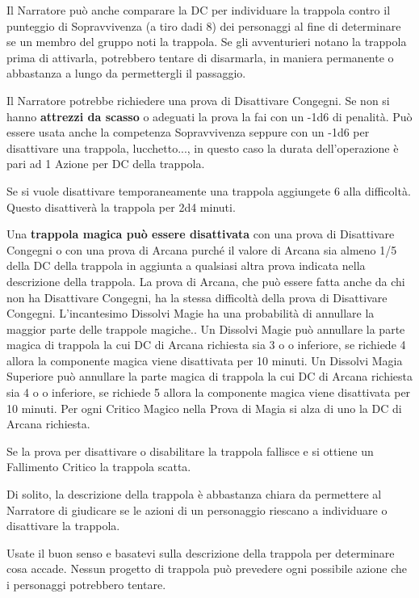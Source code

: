 \begin{multicols}{2}
Il Narratore può anche comparare la DC per individuare la trappola contro il punteggio di Sopravvivenza (a tiro dadi 8) dei personaggi al fine di determinare se un membro del gruppo noti la trappola. Se gli avventurieri notano la trappola prima di attivarla, potrebbero tentare di disarmarla, in maniera permanente o abbastanza a lungo da permettergli il passaggio.

Il Narratore potrebbe richiedere una prova di Disattivare Congegni. Se non si hanno \textbf{attrezzi da scasso} o adeguati la prova la fai con un -1d6 di penalità. Può essere usata anche la competenza Sopravvivenza seppure con un -1d6 per disattivare una trappola, lucchetto..., in questo caso la durata dell'operazione è pari ad 1 Azione per DC della trappola.

Se si vuole disattivare temporaneamente una trappola aggiungete 6 alla difficoltà. Questo disattiverà la trappola per 2d4 minuti.

Una \textbf{trappola magica può essere disattivata} con una prova di Disattivare Congegni o con una prova di Arcana purché il valore di Arcana sia almeno 1/5 della DC della trappola in aggiunta a qualsiasi altra prova indicata nella descrizione della trappola. La prova di Arcana, che può essere fatta anche da chi non ha Disattivare Congegni, ha la stessa difficoltà della prova di  Disattivare Congegni. L'incantesimo Dissolvi Magie ha una probabilità di annullare la maggior parte delle trappole magiche.. Un Dissolvi Magie può annullare la parte magica di trappola la cui DC di Arcana richiesta sia 3 o o inferiore, se richiede 4 allora la componente magica viene disattivata per 10 minuti. Un Dissolvi Magia Superiore può annullare la parte magica di trappola la cui DC di Arcana richiesta sia 4 o o inferiore, se richiede 5 allora la componente magica viene disattivata per 10 minuti. Per ogni Critico Magico nella Prova di Magia si alza di uno la DC di Arcana richiesta.

Se la prova per disattivare o disabilitare la trappola fallisce e si ottiene un Fallimento Critico la trappola scatta.

Di solito, la descrizione della trappola è abbastanza chiara da permettere al Narratore di giudicare se le azioni di un personaggio riescano a individuare o disattivare la trappola.

Usate il buon senso e basatevi sulla descrizione della trappola per determinare cosa accade. Nessun progetto di trappola può prevedere ogni possibile azione che i personaggi potrebbero tentare.


\end{multicols}
